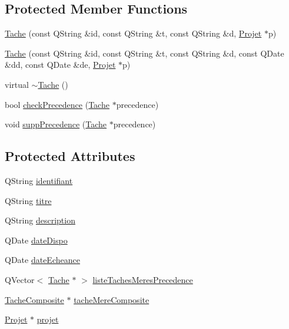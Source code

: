 \subsection*{Protected Member Functions}
\begin{DoxyCompactItemize}
\item 
\hyperlink{class_tache_af712b59bd6e56adc46904a6445431ae7}{Tache} (const Q\+String \&id, const Q\+String \&t, const Q\+String \&d, \hyperlink{class_projet}{Projet} $\ast$p)
\item 
\hyperlink{class_tache_a5b02c50c65270708b1a18c1a810ca00a}{Tache} (const Q\+String \&id, const Q\+String \&t, const Q\+String \&d, const Q\+Date \&dd, const Q\+Date \&de, \hyperlink{class_projet}{Projet} $\ast$p)
\item 
virtual \hyperlink{class_tache_a7ff832b739f8365acbe60275c7868c63}{$\sim$\+Tache} ()
\item 
bool \hyperlink{class_tache_a579d9a3b88293522b7326e5d11815091}{check\+Precedence} (\hyperlink{class_tache}{Tache} $\ast$precedence)
\item 
void \hyperlink{class_tache_a00babe6049701a1148eaca5336454731}{supp\+Precedence} (\hyperlink{class_tache}{Tache} $\ast$precedence)
\end{DoxyCompactItemize}
\subsection*{Protected Attributes}
\begin{DoxyCompactItemize}
\item 
Q\+String \hyperlink{class_tache_a9af1773c9b835900bba8814cccee450e}{identifiant}
\item 
Q\+String \hyperlink{class_tache_a1d3d20046c0c4cc8482f71bb555b79cf}{titre}
\item 
Q\+String \hyperlink{class_tache_ab3d06410b2c62ebfbe20f570c41dc4d4}{description}
\item 
Q\+Date \hyperlink{class_tache_ac8758b826b1be639dad8bcb556659a36}{date\+Dispo}
\item 
Q\+Date \hyperlink{class_tache_a7671c127da40ae35075f069a64396f45}{date\+Echeance}
\item 
Q\+Vector$<$ \hyperlink{class_tache}{Tache} $\ast$ $>$ \hyperlink{class_tache_a0f73920789e27b7c2aeb47d171d5e543}{liste\+Taches\+Meres\+Precedence}
\item 
\hyperlink{class_tache_composite}{Tache\+Composite} $\ast$ \hyperlink{class_tache_a62e6fe2722630c7bdf9a4a6a42364a19}{tache\+Mere\+Composite}
\item 
\hyperlink{class_projet}{Projet} $\ast$ \hyperlink{class_tache_a0c6d513a2a376b18cb73ab726fe4dec1}{projet}
\end{DoxyCompactItemize}

